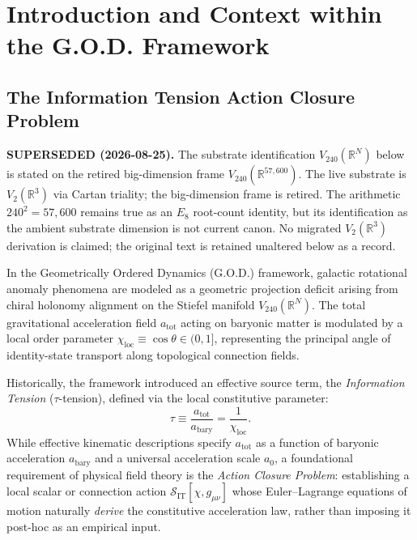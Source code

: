 \documentclass[11pt,a4paper]{article}
\theoremstyle{definition}
\begin{document}
\section{Introduction and Context within the G.O.D. Framework}

\subsection{The Information Tension Action Closure Problem}

\vspace{2mm}\noindent\textbf{\color{gold}SUPERSEDED (2026-08-25).} The substrate identification $V_{240}(\mathbb{R}^N)$ below is stated on the retired big-dimension frame $V_{240}(\mathbb{R}^{57{,}600})$. The live substrate is $V_2(\mathbb{R}^3)$ via Cartan triality; the big-dimension frame is retired. The arithmetic $240^2=57{,}600$ remains true as an $E_8$ root-count identity, but its identification as the ambient substrate dimension is not current canon. No migrated $V_2(\mathbb{R}^3)$ derivation is claimed; the original text is retained unaltered below as a record.\vspace{2mm}

In the Geometrically Ordered Dynamics (G.O.D.) framework, galactic rotational anomaly phenomena are modeled as a geometric projection deficit arising from chiral holonomy alignment on the Stiefel manifold $V_{240}(\mathbb{R}^N)$. The total gravitational acceleration field $a_{\text{tot}}$ acting on baryonic matter is modulated by a local order parameter $\chi_{\text{loc}} \equiv \cos\theta \in (0, 1]$, representing the principal angle of identity-state transport along topological connection fields. 

Historically, the framework introduced an effective source term, the \emph{Information Tension} ($\tau$-tension), defined via the local constitutive parameter:
\begin{equation}
\tau \equiv \frac{a_{\text{tot}}}{a_{\text{bary}}} = \frac{1}{\chi_{\text{loc}}}.
\end{equation}
While effective kinematic descriptions specify $a_{\text{tot}}$ as a function of baryonic acceleration $a_{\text{bary}}$ and a universal acceleration scale $a_0$, a foundational requirement of physical field theory is the \emph{Action Closure Problem}: establishing a local scalar or connection action $\mathcal{S}_{\text{IT}}[\chi, g_{\mu\nu}]$ whose Euler--Lagrange equations of motion naturally \emph{derive} the constitutive acceleration law, rather than imposing it post-hoc as an empirical input.
\end{document}
